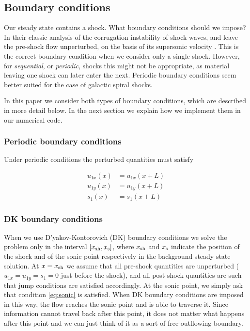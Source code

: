 \documentclass[useAMS,usenatbib]{mn2e}
\begin{document}
\subsection{Boundary conditions}

Our steady state contains a shock. What boundary conditions should we impose? In their classic analysis of the corrugation instability of shock waves, \cite{Dyakov54} and \cite{Kontorovich58} leave the pre-shock flow unperturbed, on the basis of its supersonic velocity \citep[see  in][]{landau}. This is the correct boundary condition when we consider only a single shock. However, for \emph{sequential}, or \emph{periodic}, shocks this might not be appropriate, as material leaving one shock can later enter the next. Periodic boundary conditions seem better suited for the case of galactic spiral shocks. 

In this paper we consider both types of boundary conditions, which are described in more detail below. In the next section we explain how we implement them in our numerical code.

\subsubsection{Periodic boundary conditions}

Under periodic conditions the perturbed quantities must satisfy

\begin{align}
u_{1x}(x)& = u_{1x}(x+L)\\
u_{1y}(x) &= u_{1y}(x+L)\\
s_{1}(x) &= s_{1}(x+L)
\end{align}

\subsubsection{DK boundary conditions}

When we use D'yakov-Kontorovich (DK) boundary conditions we solve the problem only in the interval $[x_{\rm sh},x_{\rm s}]$, where $x_{\rm sh}$ and $x_{\rm s}$ indicate the position of the shock and of the sonic point respectively in the background steady state solution. At $x=x_{\rm sh}$ we assume that all pre-shock quantities are unperturbed ($u_{1x}=u_{1y}=s_1=0$ just before the shock), and all post shock quantities are such that jump conditions are satisfied accordingly. At the sonic point, we simply ask that condition \eqref{eq:sonic} is satisfied. When DK boundary conditions are imposed in this way, the flow reaches the sonic point and is able to traverse it. Since information cannot travel back after this point, it does not matter what happens after this point and we can just think of it as a sort of free-outflowing boundary.
\end{document}
